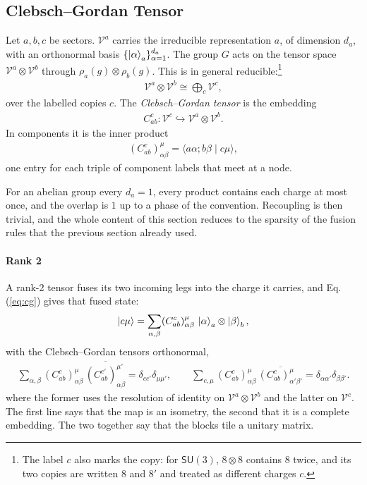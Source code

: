 \subsection{Clebsch--Gordan Tensor}
\label{sec:cg}

\begin{definition}
Let $a,b,c$ be sectors. $\mathscr{V}^{a}$ carries the irreducible representation $a$, of dimension $d_a$, with an orthonormal basis $\{\ket{\alpha}_a\}_{\alpha=1}^{d_a}$. The group $G$ acts on the tensor space $\mathscr{V}^{a}\otimes\mathscr{V}^{b}$ through $\rho_a(g)\otimes\rho_b(g)$. This is in general reducible:\footnote{The label $c$ also marks the copy: for $\mathsf{SU}(3)$, $8\otimes8$ contains $8$ twice, and its two copies are written $8$ and $8'$ and treated as different charges $c$.}
\begin{align}
    \mathscr{V}^{a}\otimes\mathscr{V}^{b}\cong\bigoplus_{c}\mathscr{V}^{c},
\end{align}
over the labelled copies $c$. The \emph{Clebsch--Gordan tensor} is the embedding \begin{align}
    C^c_{ab}:\mathscr{V}^c\hookrightarrow \mathscr{V}^a\otimes\mathscr{V}^b.
\end{align}
In components it is the inner product
\begin{align}
    (C^{c}_{ab})^{\mu}_{\alpha\beta} = \langle a\alpha ; b\beta\mid  c\mu\rangle,\label{eq:cg}
\end{align}
one entry for each triple of component labels that meet at a node.
\end{definition}
\begin{example}
For an abelian group every $d_a=1$, every product contains each charge at most once, and the overlap is $1$ up to a phase of the convention. Recoupling is then trivial, and the whole content of this section reduces to the sparsity of the fusion rules that the previous section already used.
\end{example}

\paragraph{Rank 2} A rank-2 tensor fuses its two incoming legs into the charge it carries, and Eq.(\ref{eq:cg}) gives that fused state:\begin{align}
    \ket{c\mu} = \sum_{\alpha,\beta}(C^{c}_{ab})^{\mu}_{\alpha\beta}\,\ket{\alpha}_a\otimes\ket{\beta}_b,
\end{align}
with the Clebsch--Gordan tensors orthonormal,
\begin{align}
    \sum_{\alpha,\beta}(C^{c}_{ab})^{\mu}_{\alpha\beta}\,
    \overline{(C^{c'}_{ab})^{\mu'}_{\alpha\beta}}=\delta_{cc'}\delta_{\mu\mu'},
    \qquad
    \sum_{c,\mu}(C^{c}_{ab})^{\mu}_{\alpha\beta}\,
    \overline{(C^{c}_{ab})^{\mu}_{\alpha'\beta'}}=\delta_{\alpha\alpha'}\delta_{\beta\beta'} . \label{eq:cg-orth}
\end{align}
where the former uses the resolution of identity on $\mathscr{V}^{a}\otimes\mathscr{V}^{b}$ and the latter on $\mathscr{V}^{c}$. The first line says that the map is an isometry, the second that it is a complete embedding. The two together say that the blocks tile a unitary matrix. 

